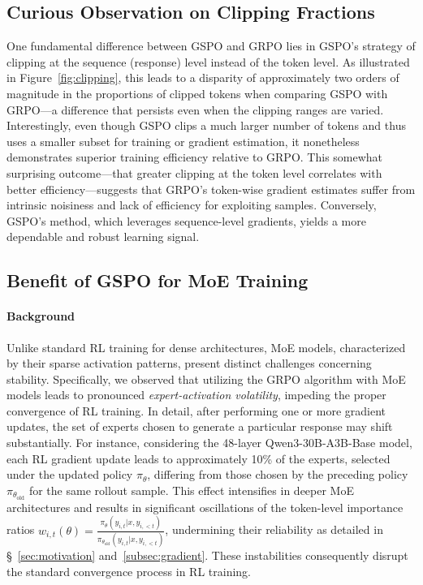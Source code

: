 \subsection{Curious Observation on Clipping Fractions}

One fundamental difference between GSPO and GRPO lies in GSPO’s strategy of clipping at the sequence (response) level instead of the token level. As illustrated in Figure~\ref{fig:clipping}, this leads to a disparity of approximately two orders of magnitude in the proportions of clipped tokens when comparing GSPO with GRPO—a difference that persists even when the clipping ranges are varied. Interestingly, even though GSPO clips a much larger number of tokens and thus uses a smaller subset for training or gradient estimation, it nonetheless demonstrates superior training efficiency relative to GRPO. This somewhat surprising outcome—that greater clipping at the token level correlates with better efficiency—suggests that GRPO’s token-wise gradient estimates suffer from intrinsic noisiness and lack of efficiency for exploiting samples. Conversely, GSPO’s method, which leverages sequence-level gradients, yields a more dependable and robust learning signal.

\subsection{Benefit of GSPO for MoE Training}
\label{subsec:routing_replay}

\paragraph{Background}
Unlike standard RL training for dense architectures, MoE models, characterized by their sparse activation patterns, present distinct challenges concerning stability. Specifically, we observed that utilizing the GRPO algorithm with MoE models leads to pronounced \textit{expert-activation volatility}, impeding the proper convergence of RL training. In detail, after performing one or more gradient updates, the set of experts chosen to generate a particular response may shift substantially. For instance, considering the 48-layer Qwen3-30B-A3B-Base model, each RL gradient update leads to approximately 10\% of the experts, selected under the updated policy $\pi_{\theta}$, differing from those chosen by the preceding policy $\pi_{\theta_\text{old}}$ for the same rollout sample. This effect intensifies in deeper MoE architectures and results in significant oscillations of the token-level importance ratios $w_{i,t}(\theta) = \frac{ \pi_{\theta} (y_{i,t} | x, y_{i,<t}) }{ \pi_{\theta_\text{old}} (y_{i,t} | x,y_{i,<t})}$, undermining their reliability as detailed in \S~\ref{sec:motivation} and~\ref{subsec:gradient}. These instabilities consequently disrupt the standard convergence process in RL training.

